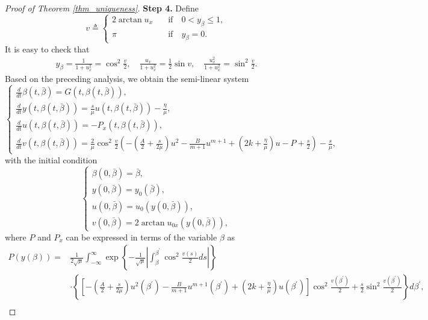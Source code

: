 \documentclass[10pt]{article}
\numberwithin{equation}{section}
\begin{document}
\begin{proof}[Proof of Theorem \ref{thm_uniqueness}]
		\textbf{Step 4.} Define 
		\begin{equation}
			v\triangleq\left\{
			\begin{array}{cl}
				2\arctan u_x & \quad\mathrm{if}\quad 0<y_\beta\leq1, \\
				\pi & \quad\mathrm{if}\quad y_\beta=0.
			\end{array}\right.
		\end{equation}
		It is easy to check that
		\begin{align*}
			y_\beta=\frac{1}{1+u_x^2}=\cos^2\frac{v}{2},\quad\frac{u_x}{1+u_x^2}=\frac{1}{2}\sin v,\quad\frac{u_x^2}{1+u_x^2}=\sin^2\frac{v}{2}.
		\end{align*}
		Based on the preceding analysis, we obtain the semi-linear system
		\begin{equation}\label{semi_unique}
			\left\{
			\begin{array}{l}
				\frac{d}{dt}\beta(t,\bar{\beta}) =G(t,\beta(t,\bar{\beta})), \\
				\frac{d}{dt}y(t,\beta(t,\bar{\beta})) =\frac{s}{\mu}u(t,\beta(t,\bar{\beta}))-\frac{\eta}{\mu}, \\
				\frac{d}{dt}u(t,\beta(t,\bar{\beta})) =-P_{x}(t,\beta(t,\bar{\beta})), \\
				\frac{d}{dt}v(t,\beta(t,\bar{\beta})) =\frac{2}{\mu}\cos^2\frac{v}{2}\left(-(\frac{A}{2}+\frac{s}{2\mu})u^2-\frac{B}{m+1}u^{m+1}+(2k+\frac{\eta}{\mu})u-P+\frac{s}{2}\right)-\frac{s}{\mu},
			\end{array}\right.
		\end{equation}
		with the initial condition
		\begin{equation}\label{semi_unique_initial}
			\left\{
			\begin{array}{l}
				\beta(0,\bar{\beta})= \bar{\beta}, \\
				y(0,\bar{\beta})= y_0(\bar{\beta}), \\
				u(0,\bar{\beta})= u_0(y(0,\bar{\beta})), \\
				v(0,\bar{\beta})= 2\arctan u_{0x}(y(0,\bar{\beta})),
			\end{array}\right.
		\end{equation}
		where $P$ and $P_x$ can be expressed in terms of the variable $\beta$ as
		\begin{align*}
			P(y(\beta)) =&\frac{1}{2\sqrt{\mu}}\int_{-\infty}^{\infty}\exp\left\{-\frac{1}{\sqrt{\mu}}\left|\int_{\beta}^{\beta^{\prime}}\cos^{2}\frac{v(s)}{2}ds\right|\right\} \\
			& \cdot\left\{\left[-(\frac{A}{2}+\frac{s}{2\mu})u^2(\beta^{\prime})-\frac{B}{m+1}u^{m+1}(\beta^{\prime})+(2k+\frac{\eta}{\mu})u(\beta^{\prime})\right]\cos^2\frac{v(\beta^{\prime})}{2}+\frac{s}{2}\sin^2\frac{v(\beta^{\prime})}{2}\right\}d\beta^{\prime},\\

\end{align*}
\end{proof}
\end{document}
